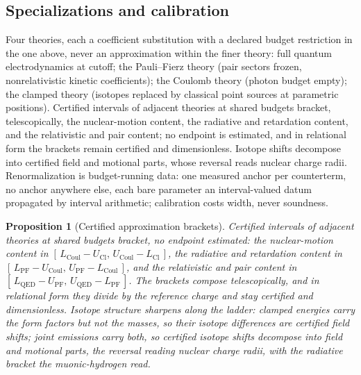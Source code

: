 \documentclass[11pt]{article}
\newtheorem{proposition}[theorem]{Proposition}
\theoremstyle{definition}
\theoremstyle{remark}
\begin{document}
\subsection{Specializations and calibration}
Four theories, each a coefficient substitution with a declared budget
restriction in the one above, never an approximation within the finer
theory: full quantum electrodynamics at cutoff; the Pauli--Fierz theory
(pair sectors frozen, nonrelativistic kinetic coefficients); the Coulomb
theory (photon budget empty); the clamped theory (isotopes replaced by
classical point sources at parametric positions).  Certified intervals
of adjacent theories at shared budgets bracket, telescopically, the
nuclear-motion content, the radiative and retardation content, and the
relativistic and pair content; no endpoint is estimated, and in
relational form the brackets remain certified and dimensionless.
Isotope shifts decompose into certified field and motional parts, whose
reversal reads nuclear charge radii.  Renormalization is budget-running
data: one measured anchor per counterterm, no anchor anywhere else, each
bare parameter an interval-valued datum propagated by interval
arithmetic; calibration costs width, never soundness.

\begin{proposition}[Certified approximation brackets]\label{prop:brackets}
Certified intervals of adjacent theories at shared budgets bracket, no
endpoint estimated: the nuclear-motion content in $[\,L_{\mathrm{Coul}} -
U_{\mathrm{Cl}},\, U_{\mathrm{Coul}} - L_{\mathrm{Cl}}\,]$, the radiative and
retardation content in $[\,L_{\mathrm{PF}} - U_{\mathrm{Coul}},\,
U_{\mathrm{PF}} - L_{\mathrm{Coul}}\,]$, and the relativistic and pair
content in $[\,L_{\mathrm{QED}} - U_{\mathrm{PF}},\, U_{\mathrm{QED}} -
L_{\mathrm{PF}}\,]$.  The brackets compose telescopically, and in relational
form they divide by the reference charge and stay certified and
dimensionless.  Isotope structure sharpens along the ladder: clamped
energies carry the form factors but not the masses, so their isotope
differences are certified \emph{field} shifts; joint emissions carry both,
so certified isotope shifts decompose into field and motional parts, the
reversal reading nuclear charge radii, with the radiative bracket the
muonic-hydrogen read.
\end{proposition}
\end{document}
